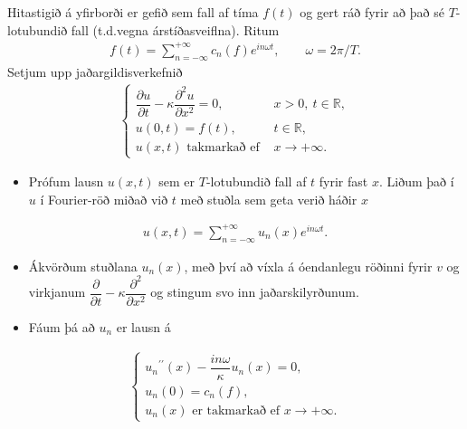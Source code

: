 \documentclass[a4paper,10pt,icelandic]{sphinxmanual}
\begin{document}
Hitastigið á yfirborði er gefið sem fall af tíma \(f(t)\) og gert ráð fyrir að það sé \(T\)-lotubundið fall (t.d.vegna árstíðasveiflna). Ritum
\begin{equation*}
\begin{split}f(t)=\sum\limits_{n=-\infty}^{+\infty}
 c_n(f)e^{in\omega t}, \qquad  \omega=2\pi/T.\end{split}
\end{equation*}
Setjum upp jaðargildisverkefnið
\begin{equation*}
\begin{split}\begin{cases}
 \dfrac{\partial u}{\partial t}-\kappa
 \dfrac{\partial^2 u}{\partial x^2}=0, &x>0, \ t\in {{\mathbb  R}},\\
 u(0,t)=f(t), &t\in {{\mathbb  R}},\\
 u(x,t) \text{ takmarkað ef } & x\to +\infty.
 \end{cases}\end{split}
\end{equation*}\begin{itemize}
\item {} 
Prófum lausn \(u(x,t)\) sem er \(T\)-lotubundið fall af \(t\) fyrir fast \(x\). Liðum það í \(u\) í Fourier-röð miðað við \(t\) með stuðla sem geta verið háðir \(x\)

\end{itemize}
\begin{equation*}
\begin{split}u(x,t)=\sum\limits_{n=-\infty}^{+\infty}
 u_n(x)e^{in\omega t}.\end{split}
\end{equation*}\begin{itemize}
\item {} 
Ákvörðum stuðlana \(u_{n}(x)\), með því að víxla á óendanlegu röðinni fyrir \(v\) og virkjanum \(\dfrac{\partial}{\partial t}-\kappa\dfrac{\partial^2}{\partial x^2}\) og stingum svo inn jaðarskilyrðunum.

\item {} 
Fáum þá að \(u_{n}\) er lausn á

\end{itemize}
\begin{equation*}
\begin{split}\begin{cases}
 u_n{{^{\prime\prime}}}(x)-\dfrac{in\omega}\kappa u_n(x)=0,\\
 u_n(0)=c_n(f),\\
 u_n(x) \text{ er takmarkað ef } x \to +\infty.
 \end{cases}\end{split}
\end{equation*}
\end{document}
